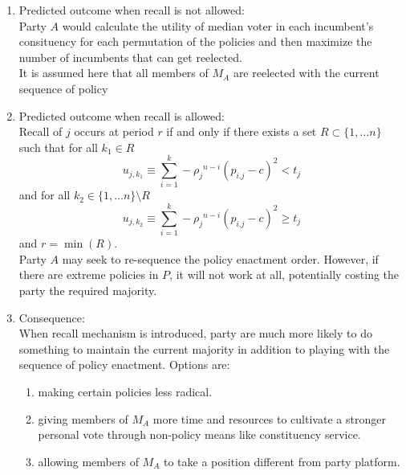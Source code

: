 \documentclass[hyphens, crop=false]{standalone}
\begin{document}
\begin{enumerate}
		\item 
		Predicted outcome when recall is not allowed:\\
		Party $A$ would
		calculate the utility of median voter in each incumbent's consituency
		for each permutation of the policies and then
		maximize the number of incumbents that can get reelected.\\
		It is assumed here that all members of $M_A$ are reelected with the current sequence of policy
		
		\item 
		Predicted outcome when recall is allowed:\\
		Recall of $j$ occurs at period $r$
		if and only if
		there exists a set $R\subset \{1,\dots n\}$
		such that for all $k_1 \in R$
		$$
		u_{j, k_1} \equiv \sum_{i = 1}^{k} -{\rho_j}^{n-i}( p_{i.j}-c)^2 < t_j 
		$$
		and for all $k_2 \in \{1,\dots n\}\setminus R$
		$$
		u_{j, k_2} \equiv \sum_{i = 1}^{k} -{\rho_j}^{n-i}( p_{i.j}-c)^2 \geq t_j 
		$$
		and $r = \min(R)$.
		\\
		Party $A$ may seek to re-sequence the policy enactment order.
		However, if there are extreme policies in $P$, it will not work at all,
		potentially costing the party the required majority.
		\item 
		Consequence: \\
		When recall mechanism is introduced,
		party are much more likely to do something to maintain the current majority in addition to playing with the sequence of policy enactment.
		Options are: 
		\begin{enumerate}
			\item 
			making certain policies less radical.
			\item 
			giving members of $M_A$ more time and resources to cultivate a stronger personal vote through non-policy means like constituency service.
			\item 
			allowing members of $M_A$ to take a position different from party platform.
		\end{enumerate}
	\end{enumerate}



	
\end{document}
